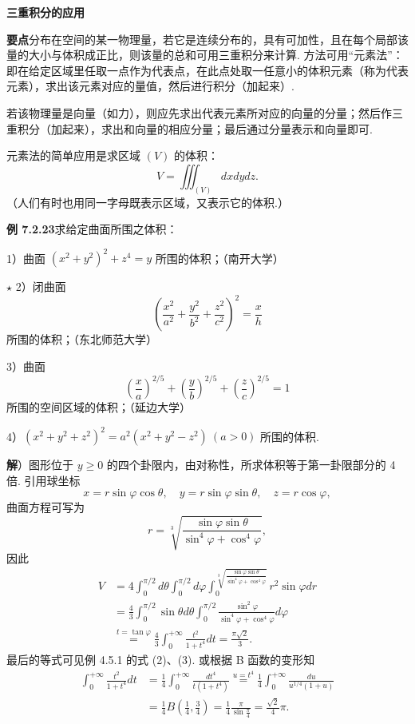 \documentclass[UTF8, 12pt, fontset=fandol, oneside]{ctexart}
\begin{document}
\noindent\textbf{三重积分的应用}

\noindent\textbf{要点}\quad 分布在空间的某一物理量，若它是连续分布的，具有可加性，且在每个局部该量的大小与体积成正比，则该量的总和可用三重积分来计算. 方法可用“元素法”：即在给定区域里任取一点作为代表点，在此点处取一任意小的体积元素（称为代表元素），求出该元素对应的量值，然后进行积分（加起来）.

若该物理量是向量（如力），则应先求出代表元素所对应的向量的分量；然后作三重积分（加起来），求出和向量的相应分量；最后通过分量表示和向量即可.

元素法的简单应用是求区域 $(V)$ 的体积：
\[
V=\iiint_{(V)}dxdydz.
\]
（人们有时也用同一字母既表示区域，又表示它的体积.）

\noindent\textbf{例 7.2.23}\quad 求给定曲面所围之体积：

1）曲面 $(x^2+y^2)^2+z^4=y$ 所围的体积；（南开大学）

$\star$ 2）闭曲面
\[
\left(\frac{x^2}{a^2}+\frac{y^2}{b^2}+\frac{z^2}{c^2}\right)^2=\frac xh
\]
所围的体积；（东北师范大学）

3）曲面
\[
\left(\frac xa\right)^{2/5}+\left(\frac yb\right)^{2/5}
+\left(\frac zc\right)^{2/5}=1
\]
所围的空间区域的体积；（延边大学）

4）$(x^2+y^2+z^2)^2=a^2(x^2+y^2-z^2)\ (a>0)$ 所围的体积.

\noindent\textbf{解}）图形位于 $y\ge0$ 的四个卦限内，由对称性，所求体积等于第一卦限部分的 4 倍. 引用球坐标
\[
x=r\sin\varphi\cos\theta,\quad y=r\sin\varphi\sin\theta,\quad z=r\cos\varphi,
\]
曲面方程可写为
\[
r=\sqrt[3]{\frac{\sin\varphi\sin\theta}{\sin^4\varphi+\cos^4\varphi}},
\]
因此
\[
\begin{aligned}
V&=4\int_0^{\pi/2}d\theta\int_0^{\pi/2}d\varphi
\int_0^{\sqrt[3]{\frac{\sin\varphi\sin\theta}{\sin^4\varphi+\cos^4\varphi}}}
r^2\sin\varphi dr\\
&=\frac43\int_0^{\pi/2}\sin\theta d\theta
\int_0^{\pi/2}\frac{\sin^2\varphi}{\sin^4\varphi+\cos^4\varphi}d\varphi\\
&\stackrel{t=\tan\varphi}=
\frac43\int_0^{+\infty}\frac{t^2}{1+t^4}dt
=\frac{\pi\sqrt2}3.
\end{aligned}
\]
最后的等式可见例 4.5.1 的式 (2)、(3). 或根据 B 函数的变形知
\[
\begin{aligned}
\int_0^{+\infty}\frac{t^2}{1+t^4}dt
&=\frac14\int_0^{+\infty}\frac{dt^4}{t(1+t^4)}
\stackrel{u=t^4}=\frac14\int_0^{+\infty}\frac{du}{u^{1/4}(1+u)}\\
&=\frac14B\left(\frac14,\frac34\right)
=\frac14\frac\pi{\sin\frac\pi4}
=\frac{\sqrt2}4\pi.
\end{aligned}
\]
\end{document}
